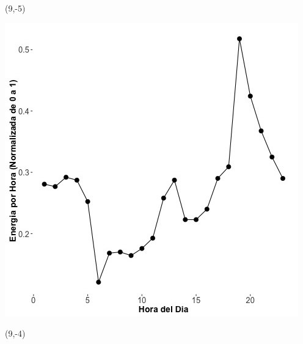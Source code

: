 \documentclass{article}\usepackage[]{graphicx}\usepackage[]{color}
\newenvironment{knitrout}{}{} %
\begin{document}
 \begin{textblock}{1}(9,-5)
\begin{minipage}{20em}
\begingroup

\endgroup
\end{minipage}
\end{textblock}

\begin{knitrout}
\color{fgcolor}
\includegraphics[scale=0.65]{figure/A22_plot_norm_median} 
\end{knitrout}


 \begin{textblock}{1}(9,-4)
\begin{minipage}{20em}
\begingroup

\endgroup
\end{minipage}
\end{textblock}
\end{document}
